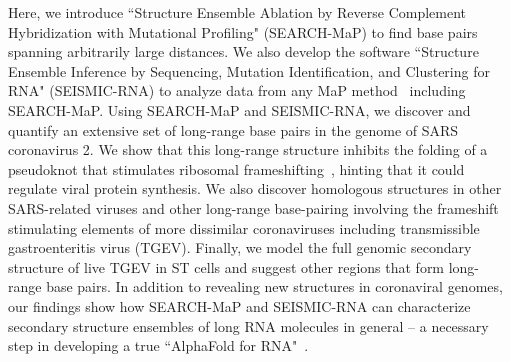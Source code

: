 \documentclass[main.tex]{subfiles}
\begin{document}
Here, we introduce ``Structure Ensemble Ablation by Reverse Complement Hybridization with Mutational Profiling" (SEARCH-MaP) to find base pairs spanning arbitrarily large distances.
We also develop the software ``Structure Ensemble Inference by Sequencing, Mutation Identification, and Clustering for RNA" (SEISMIC-RNA) to analyze data from any MaP method~\cite{Siegfried2014,Zubradt2016} including SEARCH-MaP.
Using SEARCH-MaP and SEISMIC-RNA, we discover and quantify an extensive set of long-range base pairs in the genome of SARS coronavirus 2.
We show that this long-range structure inhibits the folding of a pseudoknot that stimulates ribosomal frameshifting~\cite{Kelly2020,KZhang2021}, hinting that it could regulate viral protein synthesis.
We also discover homologous structures in other SARS-related viruses and other long-range base-pairing involving the frameshift stimulating elements of more dissimilar coronaviruses including transmissible gastroenteritis virus (TGEV).
Finally, we model the full genomic secondary structure of live TGEV in ST cells and suggest other regions that form long-range base pairs.
In addition to revealing new structures in coronaviral genomes, our findings show how SEARCH-MaP and SEISMIC-RNA can characterize secondary structure ensembles of long RNA molecules in general -- a necessary step in developing a true ``AlphaFold for RNA"~\cite{Schneider2023}.
\end{document}
